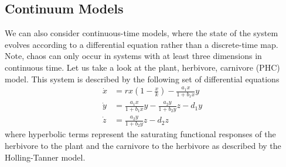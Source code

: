 \documentclass{article}
\theoremstyle{definition}
\begin{document}
\subsection{Continuum Models}
We can also consider continuous-time models, where the state of the system evolves according to a differential equation rather than a discrete-time map. Note, chaos can only occur in systems with at least three dimensions in continuous time. Let us take a look at the plant, herbivore, carnivore (PHC) model. This system is described by the following set of differential equations
\begin{align*}
    \dot x &= rx\left(1-\frac{x}{k} \right)-\frac{a_1 x}{1+b_1x}y \\
    \dot y &= \frac{a_1 x}{1+b_1x}y - \frac{a_2 y}{1+b_2y}z -d_1y \\
    \dot z &= \frac{a_2 y}{1+b_2y}z - d_2 z
\end{align*}
where hyperbolic terms represent the saturating functional responses of the herbivore to the plant and the carnivore to the herbivore as described by the Holling-Tanner model. 
\end{document}
